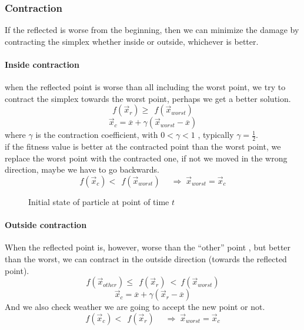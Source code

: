 \subsubsection{Contraction}

If the reflected is worse from the beginning, then we can minimize the
damage by contracting the simplex whether inside or outside, whichever
is better.


\paragraph{Inside contraction}

when the reflected point is worse than all including the worst point, we
try to contract the simplex towards the worst point, perhaps we get a
better solution.\\
{\[f({\overset{\rightarrow}{x}}_{r}) \geq \ \ f({\overset{\rightarrow}{x}}_{worst})\]}{\[{\overset{\rightarrow}{x}}_{c} = \overline{x} + \gamma({\overset{\rightarrow}{x}}_{worst} - \overline{x})\]}where
{\(\gamma\)} is the contraction coefficient, with {\(0 < \gamma < 1\)} ,
typically {\(\gamma = \frac{1}{2}\)}.\\
if the fitness value is better at the contracted point than the worst
point, we replace the worst point with the contracted one, if not we
moved in the wrong direction, maybe we have to go backwards.\\
{\[f({\overset{\rightarrow}{x}}_{c}) < \ \ f({\overset{\rightarrow}{x}}_{worst})\quad\;\Longrightarrow\;{\overset{\rightarrow}{x}}_{worst} = {\overset{\rightarrow}{x}}_{c}\]}

    \begin{figure}[htbp]
        \centering
        \scalebox{1.1}{}
        \caption{Initial state of particle at point of time $t$ }
        \label{fig:label}
    \end{figure}



\paragraph{Outside contraction}

When the reflected point is, however, worse than the ``other'' point ,
but better than the worst, we can contract in the outside direction
(towards the reflected point).\\
{\[f({\overset{\rightarrow}{x}}_{other}) \leq \ \ f({\overset{\rightarrow}{x}}_{r})\  < \ f({\overset{\rightarrow}{x}}_{worst})\]}{\[{\overset{\rightarrow}{x}}_{c} = \overline{x} + \gamma({\overset{\rightarrow}{x}}_{r} - \overline{x})\]}And
we also check weather we are going to accept the new point or not.\\
{\[f({\overset{\rightarrow}{x}}_{c}) < \ \ f({\overset{\rightarrow}{x}}_{r})\quad\;\Longrightarrow\;{\overset{\rightarrow}{x}}_{worst} = {\overset{\rightarrow}{x}}_{c}\]}

